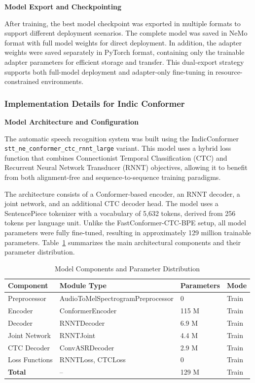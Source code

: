 \textbf{Model Export and Checkpointing}

After training, the best model checkpoint was exported in multiple formats to support different deployment scenarios. The complete model was saved in NeMo format with full model weights for direct deployment. In addition, the adapter weights were saved separately in PyTorch format, containing only the trainable adapter parameters for efficient storage and transfer. This dual-export strategy supports both full-model deployment and adapter-only fine-tuning in resource-constrained environments.

\subsubsection{Implementation Details for Indic Conformer}

\textbf{Model Architecture and Configuration}

The automatic speech recognition system was built using the IndicConformer \texttt{stt\_ne\_conformer\_ctc\_rnnt\_large} variant. This model uses a hybrid loss function that combines Connectionist Temporal Classification (CTC) and Recurrent Neural Network Transducer (RNNT) objectives, allowing it to benefit from both alignment-free and sequence-to-sequence training paradigms.

The architecture consists of a Conformer-based encoder, an RNNT decoder, a joint network, and an additional CTC decoder head. The model uses a SentencePiece tokenizer with a vocabulary of 5,632 tokens, derived from 256 tokens per language unit. Unlike the FastConformer-CTC-BPE setup, all model parameters were fully fine-tuned, resulting in approximately 129 million trainable parameters. Table~\ref{tab:indic_model} summarizes the main architectural components and their parameter distribution.

\begin{table}[H]
\caption{Model Components and Parameter Distribution}
\label{tab:indic_model}
\centering
\begin{tabular}{|l|l|l|l|}
\hline
\textbf{Component} & \textbf{Module Type} & \textbf{Parameters} & \textbf{Mode} \\
\hline
Preprocessor & AudioToMelSpectrogramPreprocessor & 0 & Train \\
Encoder & ConformerEncoder & 115 M & Train \\
Decoder & RNNTDecoder & 6.9 M & Train \\
Joint Network & RNNTJoint & 4.4 M & Train \\
CTC Decoder & ConvASRDecoder & 2.9 M & Train \\
Loss Functions & RNNTLoss, CTCLoss & 0 & Train \\
\textbf{Total} & -- & 129 M & Train \\
\hline
\end{tabular}
\end{table}

